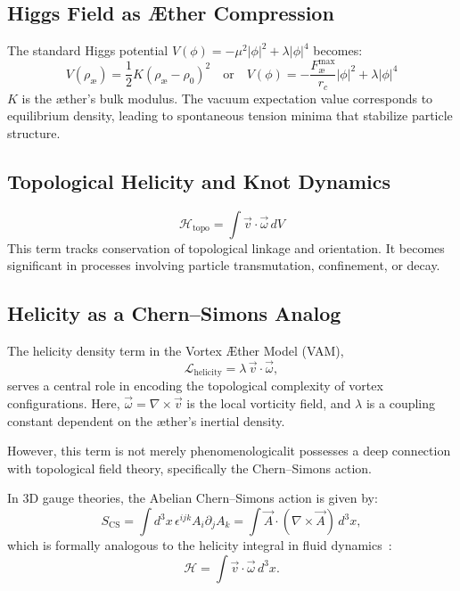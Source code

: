 \subsection{Higgs Field as \AE{}ther Compression}
The standard Higgs potential $V(\phi) = -\mu^2|\phi|^2 + \lambda|\phi|^4$ becomes:
\begin{equation}
    V(\rho_\text{\ae}) = \frac{1}{2}K(\rho_\text{\ae} - \rho_0)^2 \quad\text{or}\quad V(\phi) = -\frac{F^{\text{max}}_{\text{\ae}}}{r_c} |\phi|^2 + \lambda |\phi|^4
\end{equation}
$K$ is the \ae{}ther's bulk modulus. The vacuum expectation value corresponds to equilibrium density, leading to spontaneous tension minima that stabilize particle structure.

\subsection{Topological Helicity and Knot Dynamics}
\begin{equation}
    \mathcal{H}_\text{topo} = \int \vec{v} \cdot \vec{\omega} \, dV
\end{equation}
This term tracks conservation of topological linkage and orientation. It becomes significant in processes involving particle transmutation, confinement, or decay.

\subsection{Helicity as a Chern--Simons Analog}
The helicity density term in the Vortex \AE{}ther Model (VAM),
\begin{equation}
\mathcal{L}_{\text{helicity}} = \lambda\, \vec{v} \cdot \vec{\omega},
\end{equation}
serves a central role in encoding the topological complexity of vortex configurations. Here, $\vec{\omega} = \nabla \times \vec{v}$ is the local vorticity field, and $\lambda$ is a coupling constant dependent on the \ae{}ther's inertial density.

However, this term is not merely phenomenological\textemdash it possesses a deep connection with topological field theory, specifically the Chern--Simons action.

In 3D gauge theories, the Abelian Chern--Simons action is given by:
\begin{equation}
S_{\text{CS}} = \int d^3x\, \epsilon^{ijk} A_i \partial_j A_k = \int \vec{A} \cdot (\nabla \times \vec{A})\, d^3x,
\end{equation}
which is formally analogous to the helicity integral in fluid dynamics~\cite{moffatt1969degree,jackiw1990chern}:
\begin{equation}
\mathcal{H} = \int \vec{v} \cdot \vec{\omega}\, d^3x.
\end{equation}

